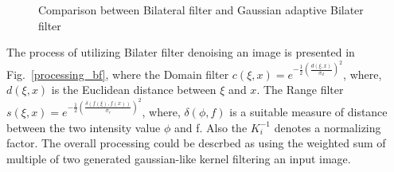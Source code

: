 \documentclass[12pt]{article}
\begin{document}








\begin{figure}[H]
  \centering
  \quad
\caption{Comparison between Bilateral filter and Gaussian adaptive Bilater filter}
\label{processing}
\end{figure}

The process of utilizing Bilater filter denoising an image is presented in Fig.~\ref{processing_bf}, where the Domain filter $c(\xi, x) = e^{-\frac{1}{2}(\frac{d(\xi, x)}{\sigma_{d}})^2}$,  where, $d(\xi, x)$ is the Euclidean distance between $\xi$ and $x$. The Range filter $s(\xi, x) = e^{-\frac{1}{2}(\frac{\delta(f(\xi), f(x))}{\sigma_{r}})^{2}}$, where, $\delta(\phi, f)$ is a suitable measure of distance between the two intensity value $\phi$ and f. Also the $K_i^{-1}$ denotes a normalizing factor.
The overall processing could be descrbed as using the weighted sum of multiple of two generated gaussian-like kernel filtering an input image.
\end{document}
